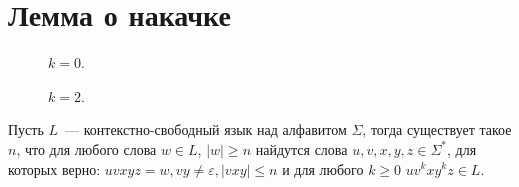 \section{Лемма о накачке}
\label{sec:CFLPumpingLemma}

\begin{marginfigure}
    \centering
    
    \caption{Разбиение цепочки для леммы о накачке}
    \label{fig:pumping1}
\end{marginfigure}

\begin{marginfigure}
    \begin{center}
        \begin{subfigure}{\marginparwidth}
            \centering
            
            \caption{$k = 0$.}
        \end{subfigure}

        \begin{subfigure}{\linewidth}
            \centering
            
            \caption{$k = 2$.}
        \end{subfigure}
    \end{center}
    \caption{Пример накачки цепочки с рисунка~\ref{fig:pumping1}}
    \label{fig:pumping2}
\end{marginfigure}

\begin{lemma}
    Пусть $L$~--- контекстно-свободный язык над алфавитом $\Sigma$, тогда существует такое $n$, что для любого слова $w \in L$, $|w| \geq n$ найдутся слова $u,v,x,y,z\in \Sigma^*$, для которых верно: $uvxyz = w, vy\neq \varepsilon,|vxy|\leq n$ и для любого $k \geq 0$  $uv^kxy^kz \in L$.
\end{lemma}

